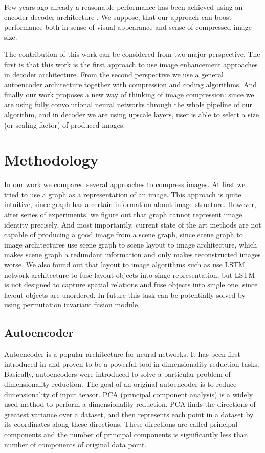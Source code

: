 Few years ago already a reasonable performance has been achieved using an encoder-decoder architecture \cite{Theis_Shi_Cunningham_Huszar_2017}. We suppose, that our approach can boost performance both in sense of visual appearance and sense of compressed image size.

The contribution of this work can be considered from two major perspective. The first is that this work is the first approach to use image enhancement approaches in decoder architecture. From the second perspective we use a general autoencoder architecture together with compression and coding algorithms. And finally our work proposes a new way of thinking of image compression: since we are using fully convolutional neural networks through the whole pipeline of our algorithm, and in decoder we are using upscale layers, user is able to select a size (or scaling factor) of produced images.

\chapter{Methodology}

In our work we compared several approaches to compress images. At first we tried to use a graph as a representation of an image. This approach is quite intuitive, since graph has a certain information about image structure. However, after series of experiments, we figure out that graph cannot represent image identity precisely. And most importantly, current state of the art methods are not capable of producing a good image from a scene graph, since scene graph to image architectures use scene graph to scene layout to image architecture, which makes scene graph a redundant information and only makes reconstructed images worse. We also found out that layout to image algorithms such as \cite{Zhao_Meng_Yin_Sigal_2019} use LSTM network architecture to fuse layout objects into singe representation, but LSTM is not designed to capture spatial relations and fuse objects into single one, since layout objects are unordered. In future this task can be potentially solved by using permutation invariant fusion module.

\section{Autoencoder}

Autoencoder is a popular architecture for neural networks. It has been first introduced in \cite{Autoencoder_2006} and proven to be a powerful tool in dimensionality reduction tasks. Basically, autoencoders were introduced to solve a particular problem of dimensionality reduction. The goal of an original autoencoder is to reduce dimensionality of input tensor. PCA (principal component analysis) is a widely used method to perform a dimensionality reduction. PCA finds the directions of greatest variance over a dataset, and then represents each point in a dataset by its coordinates along these directions. These directions are called principal components and the number of principal components is significantly less than number of components of original data point.

